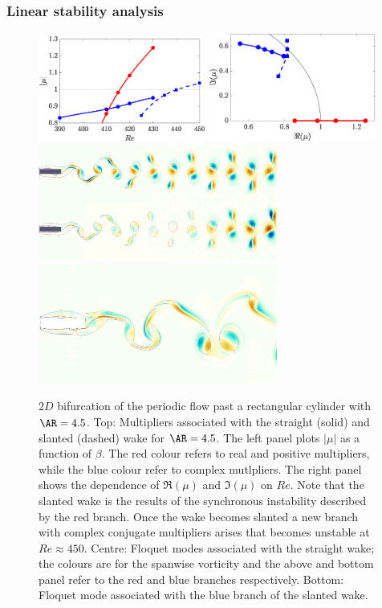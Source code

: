 \subsubsection{Linear stability analysis}
\begin{figure}
\centering
\includegraphics[width=0.49\textwidth]{./fig/AR4p5/multipliers_2D.eps}
\includegraphics[width=0.49\textwidth]{./fig/AR4p5/multipliers_2D_b.eps}
\includegraphics[width=0.7\textwidth]{./fig/AR4p5/omegaz_beta0_Re430_AB.png}
\includegraphics[width=0.7\textwidth]{./fig/AR4p5/Floqetmode_beta_0_Re450_AR4p5.png}
\caption{$2D$ bifurcation of the periodic flow past a rectangular cylinder with $\AR=4.5$. Top: Multipliers associated with the straight (solid) and slanted (dashed) wake for $\AR=4.5$. The left panel plots $|\mu|$ as a function of $\beta$. The red colour refers to real and positive multipliers, while the blue colour refer to complex mutlpliers. The right panel shows the dependence of $\Re(\mu)$ and $\Im(\mu)$ on $Re$. Note that the slanted wake is the results of the synchronous instability described by the red branch. Once the wake becomes slanted a new branch with complex conjugate multipliers arises that becomes unstable at $Re \approx 450$. Centre: Floquet modes associated with the straight wake; the colours are for the spanwise vorticity and the above and bottom panel refer to the red and blue branches respectively. Bottom: Floquet mode associated with the blue branch of the slanted wake.}

\end{figure}
